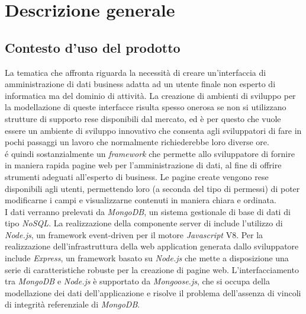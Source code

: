 \section{Descrizione generale}

	\subsection{Contesto d'uso del prodotto}
		
		La tematica che \ProjectName{} affronta riguarda la necessità di creare un'interfaccia di amministrazione di dati business adatta ad un utente finale non esperto di informatica ma del dominio di attività. La creazione di ambienti di sviluppo per la modellazione di queste interfacce risulta spesso onerosa se non si utilizzano strutture di supporto rese disponibili dal mercato, ed è per questo che \ProjectName{} vuole essere	un ambiente di sviluppo innovativo che consenta agli sviluppatori di fare in pochi passaggi un lavoro che normalmente richiederebbe loro diverse ore.\\
		\ProjectName{} é quindi sostanzialmente un \textit{framework} che permette allo sviluppatore di fornire in maniera rapida pagine web per l'amministrazione di dati, al fine di offrire strumenti adeguati all'esperto di business. Le pagine create vengono rese disponibili agli utenti, permettendo loro (a seconda del tipo di permessi) di poter modificarne i campi e visualizzarne contenuti in maniera chiara e ordinata.\\
		I dati verranno prelevati da \textit{MongoDB}, un sistema 	gestionale di base di dati di tipo \textit{NoSQL}. La realizzazione della componente server di \ProjectName{} include l'utilizzo di \textit{Node.js}, un framework event-driven per il motore \textit{Javascript} V8. Per la realizzazione dell'infrastruttura della web application generata dallo sviluppatore \ProjectName{} include \textit{Express}, un framework basato su \textit{Node.js} che mette a disposizione una serie di caratteristiche robuste per la creazione di pagine web. L'interfacciamento tra \textit{MongoDB} e \textit{Node.js} è supportato da \textit{Mongoose.js}, che si occupa della modellazione dei dati dell'applicazione e risolve il problema dell'assenza di vincoli di integrità referenziale di \textit{MongoDB}.

